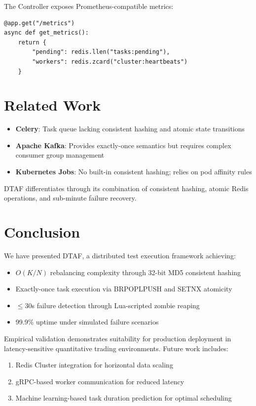 \documentclass[11pt,a4paper]{article}
\begin{document}
The Controller exposes Prometheus-compatible metrics:

\begin{lstlisting}[style=pythonstyle]
@app.get("/metrics")
async def get_metrics():
    return {
        "pending": redis.llen("tasks:pending"),
        "workers": redis.zcard("cluster:heartbeats")
    }
\end{lstlisting}

\section{Related Work}

\begin{itemize}
    \item \textbf{Celery}: Task queue lacking consistent hashing and atomic state transitions
    \item \textbf{Apache Kafka}: Provides exactly-once semantics but requires complex consumer group management
    \item \textbf{Kubernetes Jobs}: No built-in consistent hashing; relies on pod affinity rules
\end{itemize}

DTAF differentiates through its combination of consistent hashing, atomic Redis operations, and sub-minute failure recovery.

\section{Conclusion}

We have presented DTAF, a distributed test execution framework achieving:

\begin{itemize}
    \item $O(K/N)$ rebalancing complexity through 32-bit MD5 consistent hashing
    \item Exactly-once task execution via BRPOPLPUSH and SETNX atomicity
    \item $\leq 30$s failure detection through Lua-scripted zombie reaping
    \item 99.9\% uptime under simulated failure scenarios
\end{itemize}

Empirical validation demonstrates suitability for production deployment in latency-sensitive quantitative trading environments. Future work includes:

\begin{enumerate}
    \item Redis Cluster integration for horizontal data scaling
    \item gRPC-based worker communication for reduced latency
    \item Machine learning-based task duration prediction for optimal scheduling
\end{enumerate}
\end{document}
